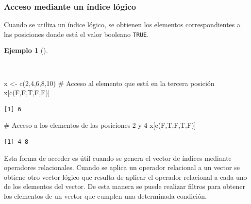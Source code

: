 \documentclass[
  spanish,
  a4paper,
]{scrreport}
\newenvironment{Shaded}{\begin{snugshade}}{\end{snugshade}}
\newcommand{\CommentTok}[1]{\textcolor[rgb]{0.37,0.37,0.37}{#1}}
\newcommand{\DecValTok}[1]{\textcolor[rgb]{0.68,0.00,0.00}{#1}}
\newcommand{\FunctionTok}[1]{\textcolor[rgb]{0.28,0.35,0.67}{#1}}
\newcommand{\NormalTok}[1]{\textcolor[rgb]{0.00,0.23,0.31}{#1}}
\newcommand{\OtherTok}[1]{\textcolor[rgb]{0.00,0.23,0.31}{#1}}
\theoremstyle{definition}
\theoremstyle{definition}
\newtheorem{example}{Ejemplo}[chapter]
\theoremstyle{remark}
\begin{document}
\subsubsection{Acceso mediante un índice
lógico}\label{acceso-mediante-un-uxedndice-luxf3gico}

Cuando se utiliza un índice lógico, se obtienen los elementos
correspondientes a las posiciones donde está el valor booleano
\texttt{TRUE}.

\begin{example}[]\protect\hypertarget{exm-acceso-vector-indice-logico}{}\label{exm-acceso-vector-indice-logico}

~

\begin{Shaded}
\begin{Highlighting}[]
\NormalTok{x }\OtherTok{\textless{}{-}} \FunctionTok{c}\NormalTok{(}\DecValTok{2}\NormalTok{,}\DecValTok{4}\NormalTok{,}\DecValTok{6}\NormalTok{,}\DecValTok{8}\NormalTok{,}\DecValTok{10}\NormalTok{)}
\CommentTok{\# Acceso al elemento que está en la tercera posición}
\NormalTok{x[}\FunctionTok{c}\NormalTok{(F,F,T,F,F)]}
\end{Highlighting}
\end{Shaded}

\begin{verbatim}
[1] 6
\end{verbatim}

\begin{Shaded}
\begin{Highlighting}[]
\CommentTok{\# Acceso a los elementos de las posiciones 2 y 4}
\NormalTok{x[}\FunctionTok{c}\NormalTok{(F,T,F,T,F)]}
\end{Highlighting}
\end{Shaded}

\begin{verbatim}
[1] 4 8
\end{verbatim}

\end{example}

Esta forma de acceder es útil cuando se genera el vector de índices
mediante operadores relacionales. Cuando se aplica un operador
relacional a un vector se obtiene otro vector lógico que resulta de
aplicar el operador relacional a cada uno de los elementos del vector.
De esta manera se puede realizar filtros para obtener los elementos de
un vector que cumplen una determinada condición.
\end{document}
